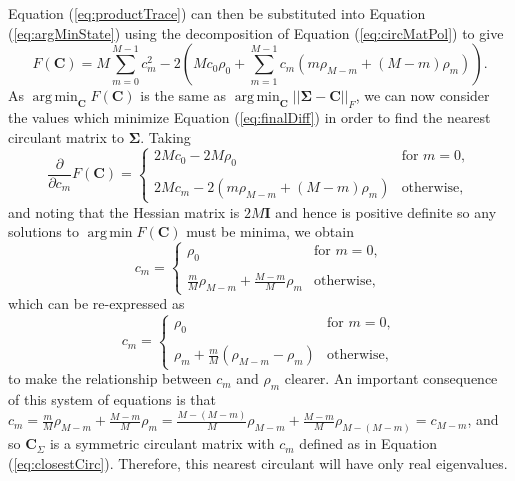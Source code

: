 \documentclass[letterpaper,12pt,oneside,final]{article}
\newcommand{\m}[1]{\mathbf{#1}}               %
\newcommand{\sm}[1]{\boldsymbol{#1}}   %
\newcommand{\norm}[1]{||{#1}||}              %
\newcommand{\frob}[1]{\norm{#1}_F}
\DeclareMathOperator*{\argmin}{arg\,min}
\begin{document}
Equation (\ref{eq:productTrace}) can then be substituted into Equation (\ref{eq:argMinState}) using the decomposition of Equation (\ref{eq:circMatPol}) to give
\begin{equation} \label{eq:finalDiff}
  F(\m{C}) = M \sum_{m=0}^{M-1} c_m^2 - 2 \left ( M c_0 \rho_0 + \sum_{m=1}^{M-1} c_m (m \rho_{M-m} + (M - m) \rho_m) \right ).
\end{equation}
As $\argmin_{\m{C}} F(\m{C})$ is the same as $\argmin_{\m{C}} \frob{\sm{\Sigma} - \m{C}}$, we can now consider the values which minimize Equation (\ref{eq:finalDiff}) in order to find the nearest circulant matrix to $\sm{\Sigma}$. Taking
\begin{equation*} 
  \frac{\partial}{\partial c_m} F(\m{C}) = \begin{cases}
    2Mc_0 - 2M\rho_0 & \text{for } m = 0, \\
    & \\
    2Mc_m - 2 \left ( m \rho_{M-m} + (M - m) \rho_m \right ) & \text{otherwise},
  \end{cases}
\end{equation*}
and noting that the Hessian matrix is $2M\m{I}$ and hence is positive definite so any solutions to $\argmin F(\m{C})$ must be minima, we obtain
\begin{equation*}
  c_m = \begin{cases}
    \rho_0 & \text{for } m = 0, \\
    & \\
    \frac{m}{M} \rho_{M-m} + \frac{M-m}{M} \rho_m & \text{otherwise},
  \end{cases}
\end{equation*}
which can be re-expressed as
\begin{equation} \label{eq:closestCirc}
  c_m = \begin{cases}
    \rho_0 & \text{for } m = 0, \\
    & \\
    \rho_m + \frac{m}{M}(\rho_{M-m} - \rho_m) & \text{otherwise},
  \end{cases}
\end{equation}
to make the relationship between $c_m$ and $\rho_m$ clearer. An important consequence of this system of equations is that $c_m = \frac{m}{M} \rho_{M-m} + \frac{M-m}{M} \rho_m = \frac{M - (M - m)}{M} \rho_{M-m} + \frac{M - m}{M} \rho_{M - (M - m)} = c_{M-m}$, and so $\m{C}_{\Sigma}$ is a symmetric circulant matrix with $c_m$ defined as in Equation (\ref{eq:closestCirc}). Therefore, this nearest circulant will have only real eigenvalues.
\end{document}
